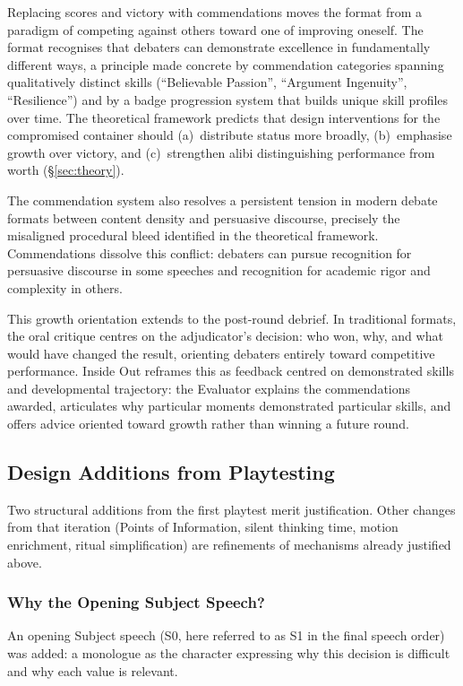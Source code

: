 Replacing scores and victory with commendations moves the format from a paradigm of competing against others toward one of improving oneself. The format recognises that debaters can demonstrate excellence in fundamentally different ways, a principle made concrete by commendation categories spanning qualitatively distinct skills (``Believable Passion'', ``Argument Ingenuity'', ``Resilience'') and by a badge progression system that builds unique skill profiles over time. The theoretical framework predicts that design interventions for the compromised container should (a)~distribute status more broadly, (b)~emphasise growth over victory, and (c)~strengthen alibi distinguishing performance from worth (§\ref{sec:theory}).

The commendation system also resolves a persistent tension in modern debate formats between content density and persuasive discourse, precisely the misaligned procedural bleed identified in the theoretical framework. Commendations dissolve this conflict: debaters can pursue recognition for persuasive discourse in some speeches and recognition for academic rigor and complexity in others.

This growth orientation extends to the post-round debrief. In traditional formats, the oral critique centres on the adjudicator's decision: who won, why, and what would have changed the result, orienting debaters entirely toward competitive performance. Inside Out reframes this as feedback centred on demonstrated skills and developmental trajectory: the Evaluator explains the commendations awarded, articulates why particular moments demonstrated particular skills, and offers advice oriented toward growth rather than winning a future round.

\subsection{Design Additions from Playtesting}

Two structural additions from the first playtest merit justification. Other changes from that iteration (Points of Information, silent thinking time, motion enrichment, ritual simplification) are refinements of mechanisms already justified above.

\subsubsection{Why the Opening Subject Speech?}

An opening Subject speech (S0, here referred to as S1 in the final speech order) was added: a monologue as the character expressing why this decision is difficult and why each value is relevant.

